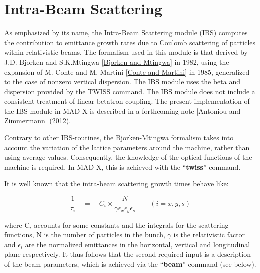 

\chapter{Intra-Beam Scattering}

 As emphasized by its name, the Intra-Beam Scattering module (IBS)
 computes the  contribution to emittance growth rates due to Coulomb
 scattering of particles within relativistic beams. The formalism used
 in this module is that derived by J.D. Bjorken and S.K.Mtingwa
 [\href{../Introduction/bibliography.html#bm1}{Bjorken and Mtingwa}] in
 1982, using the expansion of M. Conte and M. Martini
 [\href{../Introduction/bibliography.html#conte}{Conte and Martini}] in
 1985,  generalized to the case of nonzero vertical dispersion.  The IBS
 module uses the beta and dispersion provided by the TWISS command.
 The IBS module does not include a consistent treatment of linear
 betatron coupling.  The present implementation of the IBS module in
 MAD-X is described in a forthcoming note  [Antoniou and Zimmermann]
 (2012).   

 Contrary to other IBS-routines, the Bjorken-Mtingwa formalism takes
 into account the variation of the lattice parameters around the
 machine, rather than using average values. Consequently, the knowledge
 of the optical functions of the machine is required. In MAD-X, this is
 achieved with the ``\textbf{twiss}'' command.  

 It is well known that the intra-beam scattering growth times behave
 like:  
 
%  

\[
 \frac{1}{\tau_i} \quad = \quad C_i \times \frac{N}{\gamma \epsilon_x \epsilon_y \epsilon_s} \qquad (i = x, y, s)
\]

where C$_i$ accounts for some constants and the integrals for the
scattering functions, N is the number of particles in the bunch,
$\gamma$ is the relativistic factor and $\epsilon_i$ are the normalized
emittances in the horizontal, vertical and longitudinal plane
respectively. It thus follows that the second required input is a
description of the beam parameters, which is achieved via the
``\textbf{beam}'' command (see below). 

